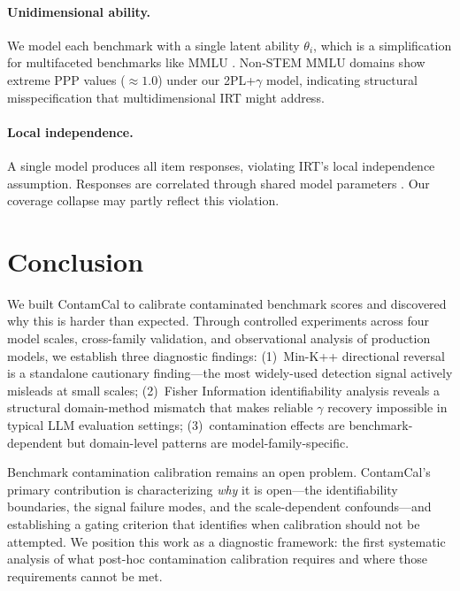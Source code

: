 \documentclass[11pt,a4paper]{article}
\newcommand{\gam}{\gamma}
\begin{document}
\paragraph{Unidimensional ability.}
We model each benchmark with a single latent ability $\theta_i$, which is a simplification for multifaceted benchmarks like MMLU \citep{reckase2009multidimensional}. Non-STEM MMLU domains show extreme PPP values ($\approx 1.0$) under our 2PL+$\gam$ model, indicating structural misspecification that multidimensional IRT might address.

\paragraph{Local independence.}
A single model produces all item responses, violating IRT's local independence assumption. Responses are correlated through shared model parameters \citep{mislevy1986bayes}. Our coverage collapse may partly reflect this violation.

\section{Conclusion}
\label{sec:conclusion}

We built ContamCal to calibrate contaminated benchmark scores and discovered why this is harder than expected.
Through controlled experiments across four model scales, cross-family validation, and observational analysis of production models, we establish three diagnostic findings:
(1)~Min-K++ directional reversal is a standalone cautionary finding---the most widely-used detection signal actively misleads at small scales;
(2)~Fisher Information identifiability analysis reveals a structural domain-method mismatch that makes reliable $\gam$ recovery impossible in typical LLM evaluation settings;
(3)~contamination effects are benchmark-dependent but domain-level patterns are model-family-specific.

Benchmark contamination calibration remains an open problem.
ContamCal's primary contribution is characterizing \emph{why} it is open---the identifiability boundaries, the signal failure modes, and the scale-dependent confounds---and establishing a gating criterion that identifies when calibration should not be attempted.
We position this work as a diagnostic framework: the first systematic analysis of what post-hoc contamination calibration requires and where those requirements cannot be met.
\end{document}
